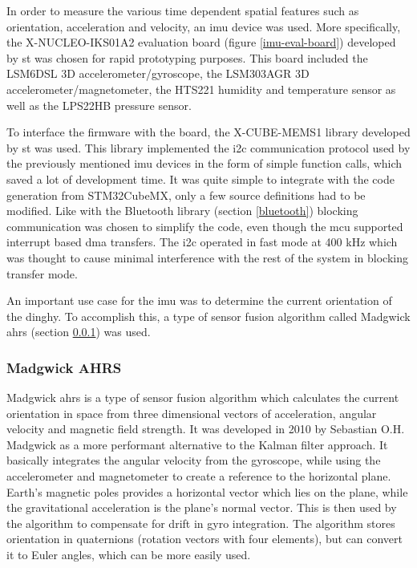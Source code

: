 In order to measure the various time dependent spatial features such as orientation, acceleration and velocity, an \gls{imu} device was used. More specifically, the X-NUCLEO-IKS01A2 \cite{x-nucleo-iks01a2} evaluation board (figure \ref{imu-eval-board}) developed by \gls{st} was chosen for rapid prototyping purposes. This board included the LSM6DSL 3D accelerometer/gyroscope, the LSM303AGR 3D accelerometer/magnetometer, the HTS221 humidity and temperature sensor as well as the LPS22HB pressure sensor.

To interface the firmware with the board, the X-CUBE-MEMS1 \cite{x-cube-mems1} library developed by \gls{st} was used. This library implemented the \gls{i2c} communication protocol used by the previously mentioned \gls{imu} devices in the form of simple function calls, which saved a lot of development time. It was quite simple to integrate with the code generation from STM32CubeMX, only a few source definitions had to be modified. Like with the Bluetooth library (section \ref{bluetooth}) blocking communication was chosen to simplify the code, even though the \gls{mcu} supported interrupt based \gls{dma} transfers. The \gls{i2c} operated in fast mode at 400 kHz which was thought to cause minimal interference with the rest of the system in blocking transfer mode.

An important use case for the \gls{imu} was to determine the current orientation of the dinghy. To accomplish this, a type of sensor fusion algorithm called Madgwick \gls{ahrs} (section \ref{madgwick}) was used.

\subsubsection{Madgwick AHRS}
\label{madgwick}
Madgwick \gls{ahrs} \cite{madgwick} is a type of sensor fusion algorithm which calculates the current orientation in space from three dimensional vectors of acceleration, angular velocity and magnetic field strength. It was developed in 2010 by Sebastian O.H. Madgwick as a more performant alternative to the Kalman filter approach. It basically integrates the angular velocity from the gyroscope, while using the accelerometer and magnetometer to create a reference to the horizontal plane. Earth’s magnetic poles provides a horizontal vector which lies on the plane, while the gravitational acceleration is the plane’s normal vector. This is then used by the algorithm to compensate for drift in gyro integration. The algorithm stores orientation in quaternions (rotation vectors with four elements), but can convert it to Euler angles, which can be more easily used.

